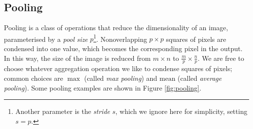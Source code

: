     \subsection{Pooling}
    \label{sec:pooling}

        Pooling is a class of operations that reduce the dimensionality of an
        image, parameterised by a \emph{pool size} $p$\footnote{Another
        parameter is the \emph{stride} $s$, which we ignore here for simplicity,
        setting $s = p$.}. Nonoverlapping $p \times p$ squares of pixels are
        condensed into one value, which becomes the corresponding pixel in the
        output. In this way, the size of the image is reduced from $m \times n$
        to $\frac{m}{p} \times \frac{n}{p}$. We are free to choose whatever
        aggregation operation we like to condense squares of pixels; common
        choices are $\max$ (called \emph{max pooling}) and $\mbox{mean}$ (called
        \emph{average pooling}). Some pooling examples are shown in Figure
        \ref{fig:pooling}.
        
